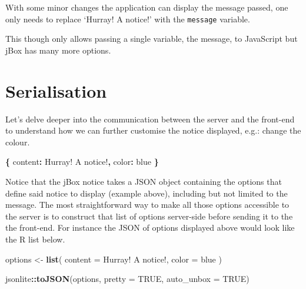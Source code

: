\documentclass[
]{krantz}
\makeatletter
\newenvironment{Shaded}{\begin{snugshade}}{\end{snugshade}}
\newcommand{\DataTypeTok}[1]{\textcolor[rgb]{0.27,0.27,0.27}{#1}}
\newcommand{\KeywordTok}[1]{\textcolor[rgb]{0.27,0.27,0.27}{\textbf{#1}}}
\newcommand{\NormalTok}[1]{#1}
\newcommand{\OperatorTok}[1]{\textcolor[rgb]{0.43,0.43,0.43}{\textbf{#1}}}
\newcommand{\OtherTok}[1]{\textcolor[rgb]{0.37,0.37,0.37}{#1}}
\newcommand{\StringTok}[1]{\textcolor[rgb]{0.5,0.5,0.5}{#1}}
\newenvironment{kframe}{%
\medskip{}
\setlength{\fboxsep}{.8em}
 \def\at@end@of@kframe{}%
 \ifinner\ifhmode%
  \def\at@end@of@kframe{\end{minipage}}%
  \begin{minipage}{\columnwidth}%
 \fi\fi%
 \def\FrameCommand##1{\hskip\@totalleftmargin \hskip-\fboxsep
 \colorbox{shadecolor}{##1}\hskip-\fboxsep
     \hskip-\linewidth \hskip-\@totalleftmargin \hskip\columnwidth}%
 \MakeFramed {\advance\hsize-\width
   \@totalleftmargin\z@ \linewidth\hsize
   \@setminipage}}%
 {\par\unskip\endMakeFramed%
 \at@end@of@kframe}
\renewenvironment{Shaded}{\begin{kframe}}{\end{kframe}}
\makeatother
\begin{document}
With some minor changes the application can display the message passed, one only needs to replace `Hurray! A notice!' with the \texttt{message} variable.

\begin{Shaded}
\end{Shaded}

This though only allows passing a single variable, the message, to JavaScript but jBox has many more options.

\hypertarget{shiny-complete-serialise}{%
\section{Serialisation}\label{shiny-complete-serialise}}

Let's delve deeper into the communication between the server and the front-end to understand how we can further customise the notice displayed, e.g.: change the colour.

\begin{Shaded}
\begin{Highlighting}[]
\OperatorTok{\{}
  \DataTypeTok{content}\OperatorTok{:} \StringTok{\textquotesingle{}Hurray! A notice!\textquotesingle{}}\OperatorTok{,}
  \DataTypeTok{color}\OperatorTok{:} \StringTok{\textquotesingle{}blue\textquotesingle{}}
\OperatorTok{\}}
\end{Highlighting}
\end{Shaded}

Notice that the jBox notice takes a JSON object containing the options that define said notice to display (example above), including but not limited to the message. The most straightforward way to make all those options accessible to the server is to construct that list of options server-side before sending it to the the front-end. For instance the JSON of options displayed above would look like the R list below.

\begin{Shaded}
\begin{Highlighting}[]
\NormalTok{options <{-}}\StringTok{ }\KeywordTok{list}\NormalTok{(}
  \DataTypeTok{content =} \StringTok{\textquotesingle{}Hurray! A notice!\textquotesingle{}}\NormalTok{,}
  \DataTypeTok{color =} \StringTok{\textquotesingle{}blue\textquotesingle{}}
\NormalTok{)}

\NormalTok{jsonlite}\OperatorTok{::}\KeywordTok{toJSON}\NormalTok{(options, }\DataTypeTok{pretty =} \OtherTok{TRUE}\NormalTok{, }\DataTypeTok{auto\_unbox =} \OtherTok{TRUE}\NormalTok{)}
\end{Highlighting}
\end{Shaded}
\end{document}
